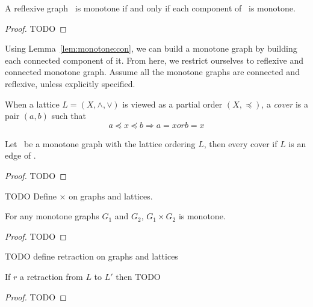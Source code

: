 \begin{lemma} \label{lem:monotone:con}
A reflexive graph \mG\ is monotone if and only if each component of \mG\ is monotone.
\end{lemma}

\begin{proof}
TODO
\end{proof}

Using Lemma~\ref{lem:monotone:con}, we can build a monotone graph
by building each connected component of it. From here, we restrict ourselves to
reflexive and connected monotone graph. Assume all the monotone graphs are
connected and reflexive, unless explicitly specified.

When a lattice \(L=(X,\wedge,\vee)\) is viewed as a partial order \((X,\preceq)\), a \emph{cover}
is a pair \((a,b)\) such that
\[a \preceq x \preceq b \Rightarrow a = x or b = x\]

\begin{lemma}
Let \mG\ be a monotone graph with the lattice ordering \(L\), then every cover
if \(L\) is an edge of \mG\@.
\end{lemma}

\begin{proof}
TODO
\end{proof}

TODO Define \(\times\) on graphs and lattices\@.
\begin{lemma}
For any monotone graphs \(G_1\) and \(G_2\), \(G_1 \times G_2\) is monotone.
\end{lemma}

\begin{proof}
TODO
\end{proof}

TODO define retraction on graphs and lattices
\begin{lemma}
If \(r\) a retraction from \(L\) to \(L'\) then
TODO
\end{lemma}

\begin{proof}
TODO
\end{proof}